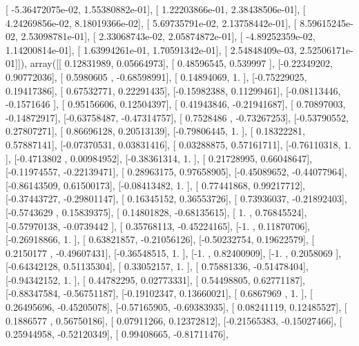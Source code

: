 \documentclass{article}
\begin{document}
       [ -5.36472075e-02,   1.55380882e-01],
       [  1.22203866e-01,   2.38438506e-01],
       [  4.24269856e-02,   8.18019366e-02],
       [  5.69735791e-02,   2.13758442e-01],
       [  8.59615245e-02,   2.53098781e-01],
       [  2.33068743e-02,   2.05874872e-01],
       [ -4.89252359e-02,   1.14200814e-01],
       [  1.63994261e-01,   1.70591342e-01],
       [  2.54848409e-03,   2.52506171e-01]]), array([[ 0.12831989,  0.05664973],
       [ 0.48596545,  0.539997  ],
       [-0.22349202,  0.90772036],
       [ 0.5980605 , -0.68598991],
       [ 0.14894069,  1.        ],
       [-0.75229025,  0.19417386],
       [ 0.67532771,  0.22291435],
       [-0.15982388,  0.11299461],
       [-0.08113446, -0.1571646 ],
       [ 0.95156606,  0.12504397],
       [ 0.41943846, -0.21941687],
       [ 0.70897003, -0.14872917],
       [-0.63758487, -0.47314757],
       [ 0.7528486 , -0.73267253],
       [-0.53790552,  0.27807271],
       [ 0.86696128,  0.20513139],
       [-0.79806445,  1.        ],
       [ 0.18322281,  0.57887141],
       [-0.07370531,  0.03831416],
       [ 0.03288875,  0.57161711],
       [-0.76110318,  1.        ],
       [-0.4713802 ,  0.00984952],
       [-0.38361314,  1.        ],
       [ 0.21728995,  0.66048647],
       [-0.11974557, -0.22139471],
       [ 0.28963175,  0.97658905],
       [-0.45089652, -0.44077964],
       [-0.86143509,  0.61500173],
       [-0.08413482,  1.        ],
       [ 0.77441868,  0.99217712],
       [-0.37443727, -0.29801147],
       [ 0.16345152,  0.36553726],
       [ 0.73936037, -0.21892403],
       [-0.5743629 ,  0.15839375],
       [ 0.14801828, -0.68135615],
       [ 1.        ,  0.76845524],
       [-0.57970138, -0.0739442 ],
       [ 0.35768113, -0.45224165],
       [-1.        ,  0.11870706],
       [-0.26918866,  1.        ],
       [ 0.63821857, -0.21056126],
       [-0.50232754,  0.19622579],
       [ 0.2150177 , -0.49607431],
       [-0.36548515,  1.        ],
       [-1.        ,  0.82400909],
       [-1.        ,  0.2058069 ],
       [-0.64342128,  0.51135304],
       [ 0.33052157,  1.        ],
       [ 0.75881336, -0.51478404],
       [-0.94342152,  1.        ],
       [ 0.44782295,  0.02773331],
       [ 0.54498805,  0.62771187],
       [-0.88347584, -0.56751187],
       [-0.19102347,  0.13660021],
       [ 0.6867969 ,  1.        ],
       [ 0.26495696, -0.45205078],
       [-0.57165905, -0.69383935],
       [ 0.08241119,  0.12485527],
       [ 0.1886577 ,  0.56750186],
       [ 0.07911266,  0.12372812],
       [-0.21565383, -0.15027466],
       [ 0.25944958, -0.52120349],
       [ 0.99408665, -0.81711476],
\end{document}
